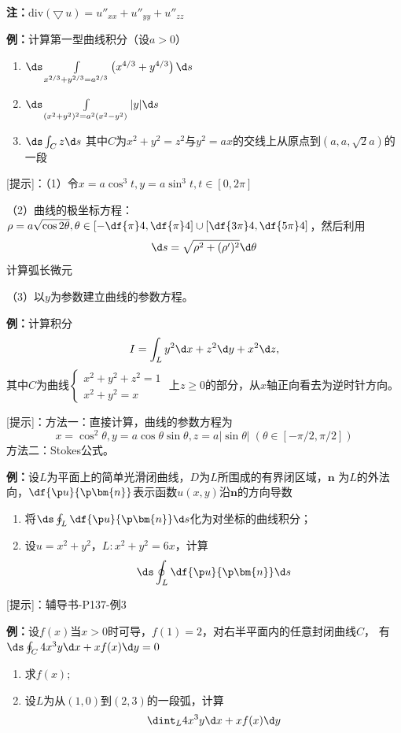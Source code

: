 {\bf 注：}$\mathrm{div}(\bigtriangledown\,u)=u''_{xx}+u''_{yy}+u''_{zz}$

{\bf 例：}计算第一型曲线积分（设$a>0$）
\begin{enumerate}[(1)]
  \item $\ds\int\limits_{x^{2/3}+y^{2/3}=a^{2/3}}
  \left(x^{4/3}+y^{4/3}\right)\d s$
  \item $\ds\int\limits_{(x^2+y^2)^2=a^2(x^2-y^2)}|y|\d s$
  \item $\ds\int_Cz\d s$
  其中$C$为$x^2+y^2=z^2$与$y^2=ax$的交线上从原点到$(a,a,\sqrt2a)$的一段
\end{enumerate}

[提示]：（1）令$x=a\cos^3t,y=a\sin^3t,t\in[0,2\pi]$

（2）曲线的极坐标方程：$\rho=a\sqrt{\cos2\theta},\theta\in\left[-\df{\pi}4,
\df{\pi}4\right]\cup\left[\df{3\pi}4,\df{5\pi}4\right]$，然后利用
$$\d s=\sqrt{\rho^2+(\rho')^2}\d\theta$$
计算弧长微元

（3）以$y$为参数建立曲线的参数方程。

{\bf 例：}计算积分
$$I=\int_Ly^2\d x+z^2\d y+x^2\d z,$$
其中$C$为曲线$\left\{\begin{array}{l}
x^2+y^2+z^2=1 \\ x^2+y^2=x
\end{array}\right.$
上$z\geq 0$的部分，从$x$轴正向看去为逆时针方向。

[提示]：方法一：直接计算，曲线的参数方程为 
$$x=\cos^2\theta,y=a\cos\theta\sin\theta, z=a|\sin\theta|\;
(\theta\in[-\pi/2,\pi/2])$$
方法二：Stokes公式。

{\bf 例：}设$L$为平面上的简单光滑闭曲线，$D$为$L$所围成的有界闭区域，$\bm{n}$
为$L$的外法向，$\df{\p u}{\p\bm{n}}$表示函数$u(x,y)$沿$\bm{n}$的方向导数
\begin{enumerate}[(1)]
  \item 将$\ds\oint_L\df{\p u}{\p\bm{n}}\d s$化为对坐标的曲线积分；
  \item 设$u=x^2+y^2$，$L:x^2+y^2=6x$，计算
  $$\ds\oint_L\df{\p u}{\p\bm{n}}\d s$$
\end{enumerate}

[提示]：辅导书-P137-例3

{\bf 例：}设$f(x)$当$x>0$时可导，$f(1)=2$，对右半平面内的任意封闭曲线$C$，
有$\ds\oint_C4x^3y\d x+xf(x)\d y=0$
\begin{enumerate}[(1)]
  \setlength{\itemindent}{1cm}
  \item 求$f(x)$;
  \item 设$L$为从$(1,0)$到$(2,3)$的一段弧，计算
  $$\dint_L4x^3y\d x+xf(x)\d y$$
\end{enumerate}

